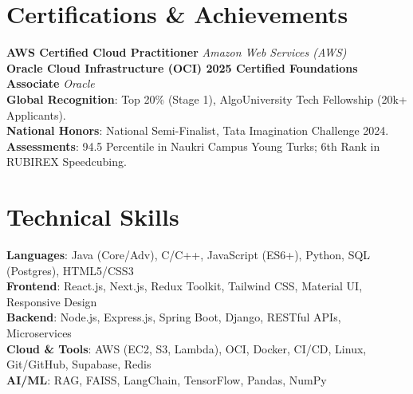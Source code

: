 \documentclass[letterpaper,11pt]{article}
\begin{document}
\section{Certifications \& Achievements}
 \begin{itemize}[leftmargin=0.15in, label={}]
    \small{\item{
     \textbf{AWS Certified Cloud Practitioner} \hfill \textit{Amazon Web Services (AWS)} \\
     \textbf{Oracle Cloud Infrastructure (OCI) 2025 Certified Foundations Associate} \hfill \textit{Oracle} \\
     
     \textbf{Global Recognition}{: Top 20\% (Stage 1), AlgoUniversity Tech Fellowship (20k+ Applicants).} \\
     \textbf{National Honors}{: National Semi-Finalist, Tata Imagination Challenge 2024.} \\
     \textbf{Assessments}{: 94.5 Percentile in Naukri Campus Young Turks; 6th Rank in RUBIREX Speedcubing.}
    }}
 \end{itemize}
 
\section{Technical Skills}
 \begin{itemize}[leftmargin=0.15in, label={}]
    \small{\item{
     \textbf{Languages}{: Java (Core/Adv), C/C++, JavaScript (ES6+), Python, SQL (Postgres), HTML5/CSS3} \\ \vspace{2pt}
     \textbf{Frontend}{: React.js, Next.js, Redux Toolkit, Tailwind CSS, Material UI, Responsive Design} \\ \vspace{2pt}
     \textbf{Backend}{: Node.js, Express.js, Spring Boot, Django, RESTful APIs, Microservices} \\ \vspace{2pt}
     \textbf{Cloud \& Tools}{: AWS (EC2, S3, Lambda), OCI, Docker, CI/CD, Linux, Git/GitHub, Supabase, Redis} \\ \vspace{2pt}
     \textbf{AI/ML}{: RAG, FAISS, LangChain, TensorFlow, Pandas, NumPy}
    }}
 \end{itemize}
\end{document}
